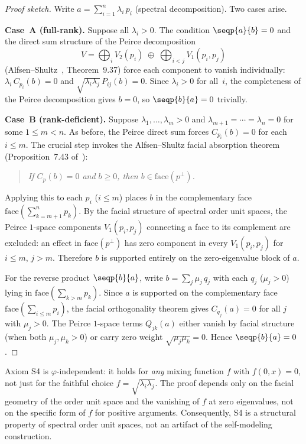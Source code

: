 \begin{proof}[Proof sketch]
Write $a = \sum_{i=1}^n \lambda_i\, p_i$ (spectral decomposition). Two
cases arise.

\medskip
\noindent\textbf{Case~A (full-rank).}
Suppose all $\lambda_i > 0$. The condition $\seqp{a}{b} = 0$ and the direct
sum structure of the Peirce decomposition
\[
  V = \bigoplus_i V_2(p_i) \;\oplus\; \bigoplus_{i<j} V_1(p_i,p_j)
\]
(Alfsen--Shultz~\cite{AlfsenShultz2003}, Theorem~9.37)
force each component to vanish individually: $\lambda_i\, C_{p_i}(b) = 0$
and $\sqrt{\lambda_i\lambda_j}\, P_{ij}(b) = 0$. Since $\lambda_i > 0$
for all~$i$, the completeness of the Peirce decomposition gives $b = 0$,
so $\seqp{b}{a} = 0$ trivially.

\medskip
\noindent\textbf{Case~B (rank-deficient).}
Suppose $\lambda_1,\ldots,\lambda_m > 0$ and
$\lambda_{m+1} = \cdots = \lambda_n = 0$ for some $1 \le m < n$. As
before, the Peirce direct sum forces $C_{p_i}(b) = 0$ for each $i \le m$.
The crucial step invokes the Alfsen--Shultz facial absorption theorem
(Proposition~7.43 of~\cite{AlfsenShultz2003}):
\begin{quote}
  \emph{If $C_p(b) = 0$ and $b \ge 0$, then
  $b \in \mathrm{face}(p^\perp)$.}
\end{quote}
Applying this to each $p_i$ ($i \le m$) places $b$ in the complementary
face $\mathrm{face}\!\left(\sum_{k=m+1}^n p_k\right)$. By the facial
structure of spectral order unit spaces, the Peirce $1$-space components
$V_1(p_i, p_j)$ connecting a face to its complement are excluded: an
effect in $\mathrm{face}(p^\perp)$ has zero component in every
$V_1(p_i,p_j)$ for $i\le m$, $j > m$. Therefore $b$ is supported
entirely on the zero-eigenvalue block of $a$.

For the reverse product $\seqp{b}{a}$, write
$b = \sum_j \mu_j\, q_j$ with each $q_j$ ($\mu_j > 0$) lying in
$\mathrm{face}\!\left(\sum_{k>m} p_k\right)$. Since $a$ is supported on
the complementary face $\mathrm{face}\!\left(\sum_{i\le m}
p_i\right)$, the facial orthogonality theorem gives $C_{q_j}(a) = 0$ for
all $j$ with $\mu_j > 0$. The Peirce $1$-space terms $Q_{jk}(a)$ either
vanish by facial structure (when both $\mu_j,\mu_k>0$) or carry zero
weight $\sqrt{\mu_j\mu_k}=0$. Hence $\seqp{b}{a} = 0$.
\end{proof}

\begin{remark}\label{rem:S4-phi-independent}
Axiom S4 is $\varphi$-independent: it holds for \emph{any} mixing
function $f$ with $f(0,x) = 0$, not just for the faithful choice
$f = \sqrt{\lambda_i\lambda_j}$. The proof depends only on the facial
geometry of the order unit space and the vanishing of $f$ at zero
eigenvalues, not on the specific form of $f$ for positive arguments.
Consequently, S4 is a structural property of spectral order unit spaces,
not an artifact of the self-modeling construction.
\end{remark}


